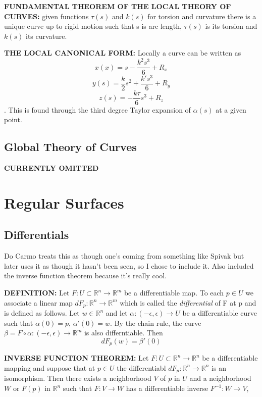 \documentclass{article}
\begin{document}
\textbf{FUNDAMENTAL THEOREM OF THE LOCAL THEORY OF CURVES:} given functions $\tau(s)$ and $k(s)$ for torsion and curvature there is a unique curve up to rigid motion such that s is arc length, $\tau(s)$ is its torsion and $k(s)$ its curvature. \vspace{5mm}

\textbf{THE LOCAL CANONICAL FORM:} Locally a curve can be written as $$\displaystyle x(x) = s - \frac{k^2s^3}{6} + R_x$$ $$\displaystyle y(s) = \frac{k}{2}s^2 + \frac{k's^3}{6} + R_y$$ $$\displaystyle z(s) = -\frac{k\tau}{6}s^3 + R_z$$. This is found through the third degree Taylor expansion of $\alpha(s)$ at a given point.

\subsection{Global Theory of Curves}
\textbf{CURRENTLY OMITTED}

\section{Regular Surfaces}
\subsection{Differentials}
Do Carmo treats this as though one's coming from something like Spivak but later uses it as though it hasn't been seen, so I chose to include it. Also included the inverse function theorem because it's really cool. \vspace{5mm}

\textbf{DEFINITION:} Let $F: U \subset \mathbb{R}^n \to \mathbb{R}^m$ be a differentiable map. To each $p \in U$ we associate a linear map $dF_p: \mathbb{R}^n \to \mathbb{R}^m$ which is called the \textit{differential} of F at p and is defined as follows. Let $w \in \mathbb{R}^n$ and let $\alpha: (-\epsilon, \epsilon) \to U$ be a differentiable curve such that $\alpha(0) = p$, $\alpha'(0) = w.$ By the chain rule, the curve $\beta = F \circ \alpha: (-\epsilon, \epsilon) \to \mathbb{R}^m$ is also differntiable. Then $$dF_p(w) = \beta'(0)$$

\textbf{INVERSE FUNCTION THEOREM:} Let $F: U \subset \mathbb{R}^n \to \mathbb{R}^n$ be a differentiable mapping and suppose that at $p \in U$ the differentiabl $dF_p: \mathbb{R}^n \to \mathbb{R}^n$ is an isomorphism. Then there exists a neighborhood $V$ of $p$ in $U$ and a neighborhood $W$ or $F(p)$ in $\mathbb{R}^n$ such that $F: V \to W$ has a differentiable inverse $F^{-1}: W \to V$,
\end{document}
